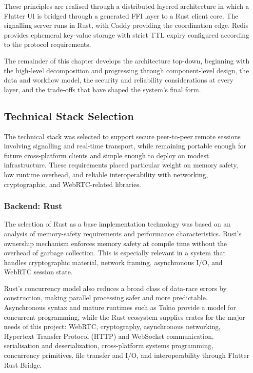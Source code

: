 \documentclass[12pt,a4paper]{article}
\begin{document}
These principles are realised through a distributed layered architecture in which a Flutter UI is bridged through a generated FFI layer to a Rust client core. The signalling server runs in Rust, with Caddy providing the coordination edge. Redis provides ephemeral key-value storage with strict TTL expiry configured according to the protocol requirements.

The remainder of this chapter develops the architecture top-down, beginning with the high-level decomposition and progressing through component-level design, the data and workflow model, the security and reliability considerations at every layer, and the trade-offs that have shaped the system’s final form.

\subsection{Technical Stack Selection}

The technical stack was selected to support secure peer-to-peer remote sessions involving signalling and real-time transport, while remaining portable enough for future cross-platform clients and simple enough to deploy on modest infrastructure. These requirements placed particular weight on memory safety, low runtime overhead, and reliable interoperability with networking, cryptographic, and WebRTC-related libraries.

\subsubsection{Backend: Rust}

The selection of Rust as a base implementation technology was based on an analysis of memory-safety requirements and performance characteristics. Rust’s ownership mechanism enforces memory safety at compile time without the overhead of garbage collection. This is especially relevant in a system that handles cryptographic material, network framing, asynchronous I/O, and WebRTC session state.

Rust’s concurrency model also reduces a broad class of data-race errors by construction, making parallel processing safer and more predictable. Asynchronous syntax and mature runtimes such as Tokio \cite{tokio} provide a model for concurrent programming, while the Rust ecosystem supplies crates for the major needs of this project: WebRTC, cryptography, asynchronous networking, Hypertext Transfer Protocol (HTTP) and WebSocket communication, serialisation and deserialization, cross-platform systems programming, concurrency primitives, file transfer and I/O, and interoperability through Flutter Rust Bridge.
\end{document}
